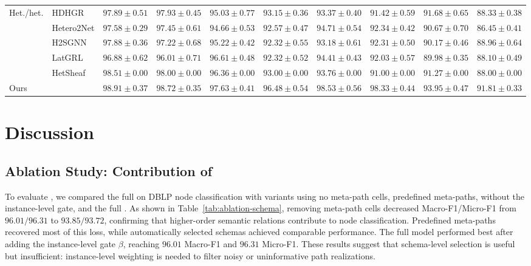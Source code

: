 \begin{table}[t]
{\begin{tabular}{llcccccccc}
    \multirow{5}{*}{Het./het.}
    & HDHGR
    & $97.89 \pm 0.51$ & $97.93 \pm 0.45$
    & $95.03 \pm 0.77$ & $93.15 \pm 0.36$
    & $93.37 \pm 0.40$ & $91.42 \pm 0.59$
    & $91.68 \pm 0.65$ & $88.33 \pm 0.38$ \\
    & Hetero2Net
    & $97.58 \pm 0.29$ & $97.45 \pm 0.61$
    & $94.66 \pm 0.53$ & $92.57 \pm 0.47$
    & $94.71 \pm 0.54$ & $92.34 \pm 0.42$
    & $90.67 \pm 0.70$ & $86.45 \pm 0.41$ \\
    & H2SGNN
    & $97.88 \pm 0.36$ & $97.22 \pm 0.68$
    & $95.22 \pm 0.42$ & $92.32 \pm 0.55$
    & $93.18 \pm 0.61$ & $92.31 \pm 0.50$
    & $90.17 \pm 0.46$ & $88.96 \pm 0.64$ \\
    & LatGRL
    & $96.88 \pm 0.62$ & $96.01 \pm 0.71$
    & $96.61 \pm 0.48$ & $92.32 \pm 0.52$
    & $94.41 \pm 0.43$ & $92.03 \pm 0.57$
    & $89.98 \pm 0.35$ & $88.10 \pm 0.49$ \\
    & HetSheaf
    & $98.51 \pm 0.00$ & $98.00 \pm 0.00$
    & $96.36 \pm 0.00$ & $93.00 \pm 0.00$
    & $93.76 \pm 0.00$ & $91.00 \pm 0.00$
    & $91.27 \pm 0.00$ & $88.00 \pm 0.00$ \\
    \midrule

    Ours
    & \textbf{\method{}}
    & $\mathbf{98.91 \pm 0.37}$ & $\mathbf{98.72 \pm 0.35}$
    & $\mathbf{97.63 \pm 0.41}$ & $\mathbf{96.48 \pm 0.54}$ 
    & $\mathbf{98.53 \pm 0.56}$ & $\mathbf{98.33 \pm 0.44}$
    & $\mathbf{93.95 \pm 0.47}$ & $\mathbf{91.81 \pm 0.33}$  \\
    \bottomrule
  \end{tabular}%
  }
\end{table}

\section{Discussion}
\label{sec:analysis-results}

\subsection{Ablation Study: Contribution of {\ampss{}}}

To evaluate \ampss{}, we compared the full \method{} on DBLP node classification with variants using no meta-path cells, predefined meta-paths, \ampss{} without the instance-level gate, and the full \ampss{}. As shown in Table~\ref{tab:ablation-schema}, removing meta-path cells decreased Macro-F1/Micro-F1 from $96.01/96.31$ to $93.85/93.72$, confirming that higher-order semantic relations contribute to node classification. Predefined meta-paths recovered most of this loss, while automatically selected schemas achieved comparable performance. The full \ampss{} model performed best after adding the instance-level gate $\beta$, reaching $96.01$ Macro-F1 and $96.31$ Micro-F1. These results suggest that schema-level selection is useful but insufficient: instance-level weighting is needed to filter noisy or uninformative path realizations.

